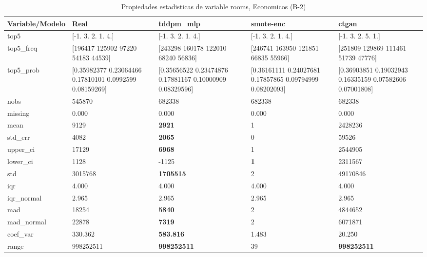 \begin{table}[H]
\centering
\fontsize{8}{14}\selectfont
\caption{Propiedades  estadisticas de variable rooms, Economicos (B-2)}
\label{table-stats-economicos-b-2-rooms}
\begin{tabular}{|l|m{10em}|m{10em}|m{10em}|m{10em}|}
\hline
 \rowcolor[gray]{0.8}
Variable/Modelo & Real & tddpm\_mlp & smote-enc & ctgan \\
\hline top5 & [-1.  3.  2.  1.  4.] & [-1.  3.  2.  1.  4.] & [-1.  3.  2.  1.  4.] & [-1.  3.  2.  5.  1.] \\
\hline top5\_freq & [196417 125902  97220  54183  44539] & [243298 160178 122010  68240  56836] & [246741 163950 121851  66835  55966] & [251809 129869 111461  51739  47776] \\
\hline top5\_prob & [0.35982377 0.23064466 0.17810101 0.0992599  0.08159269] & [0.35656522 0.23474876 0.17881167 0.10000909 0.08329596] & [0.36161111 0.24027681 0.17857865 0.09794999 0.08202093] & [0.36903851 0.19032943 0.16335159 0.07582606 0.07001808] \\
\hline nobs & 545870 & 682338 & 682338 & 682338 \\
\hline missing & 0.000 & 0.000 & 0.000 & 0.000 \\
\hline mean & 9129 & \bfseries 2921 & 1 & \cellcolor[rgb]{0.9, 0.54, 0.52} 2428236 \\
\hline std\_err & 4082 & \bfseries 2065 & 0 & \cellcolor[rgb]{0.9, 0.54, 0.52} 59526 \\
\hline upper\_ci & 17129 & \bfseries 6968 & 1 & \cellcolor[rgb]{0.9, 0.54, 0.52} 2544905 \\
\hline lower\_ci & 1128 & -1125 & \bfseries 1 & \cellcolor[rgb]{0.9, 0.54, 0.52} 2311567 \\
\hline std & 3015768 & \bfseries 1705515 & 2 & \cellcolor[rgb]{0.9, 0.54, 0.52} 49170846 \\
\hline iqr & 4.000 & 4.000 & 4.000 & 4.000 \\
\hline iqr\_normal & 2.965 & 2.965 & 2.965 & 2.965 \\
\hline mad & 18254 & \bfseries 5840 & 2 & \cellcolor[rgb]{0.9, 0.54, 0.52} 4844652 \\
\hline mad\_normal & 22878 & \bfseries 7319 & 2 & \cellcolor[rgb]{0.9, 0.54, 0.52} 6071871 \\
\hline coef\_var & 330.362 & \bfseries 583.816 & \cellcolor[rgb]{0.9, 0.54, 0.52} 1.483 & 20.250 \\
\hline range & 998252511 & \bfseries 998252511 & \cellcolor[rgb]{0.9, 0.54, 0.52} 39 & \bfseries 998252511 \\

\end{tabular}
\end{table}
